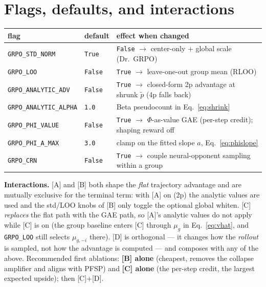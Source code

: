 \documentclass[11pt]{article}
\newcommand{\cd}[1]{\texttt{#1}}
\begin{document}
\section{Flags, defaults, and interactions}\label{sec:flags}
\begin{center}\small
\begin{tabular}{@{}lll@{}}
\toprule
flag & default & effect when changed \\
\midrule
\cd{GRPO\_STD\_NORM}      & \cd{True}  & \cd{False} $\to$ center-only $+$ global scale (Dr.\ GRPO) \\
\cd{GRPO\_LOO}            & \cd{False} & \cd{True}  $\to$ leave-one-out group mean (RLOO) \\
\cd{GRPO\_ANALYTIC\_ADV}  & \cd{False} & \cd{True}  $\to$ closed-form 2p advantage at shrunk $\tilde p$ (4p falls back) \\
\cd{GRPO\_ANALYTIC\_ALPHA}& \cd{1.0}   & Beta pseudocount in Eq.~\eqref{eq:shrink} \\
\cd{GRPO\_PHI\_VALUE}     & \cd{False} & \cd{True}  $\to$ $\Phi$-as-value GAE (per-step credit); shaping reward off \\
\cd{GRPO\_PHI\_A\_MAX}    & \cd{3.0}   & clamp on the fitted slope $a$, Eq.~\eqref{eq:phislope} \\
\cd{GRPO\_CRN}            & \cd{False} & \cd{True}  $\to$ couple neural-opponent sampling within a group \\
\bottomrule
\end{tabular}
\end{center}
\noindent\textbf{Interactions.} [A] and [B] both shape the \emph{flat} trajectory advantage and are
mutually exclusive for the terminal term: with [A] on (2p) the analytic values are used and the
std/LOO knobs of [B] only toggle the optional global whiten. [C] \emph{replaces} the flat path with the
GAE path, so [A]'s analytic values do not apply while [C] is on (the group baseline enters [C] through
$\mu_g$ in Eq.~\eqref{eq:vhat}, and \cd{GRPO\_LOO} still selects $\mu_{g,-i}$ there). [D] is orthogonal
--- it changes how the \emph{rollout} is sampled, not how the advantage is computed --- and composes
with any of the above. Recommended first ablations: \textbf{[B] alone} (cheapest, removes the collapse
amplifier and aligns with PFSP) and \textbf{[C] alone} (the per-step credit, the largest expected
upside); then [C]+[D].
\end{document}

